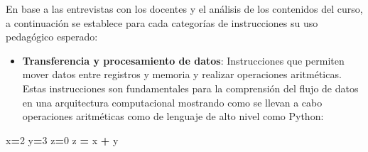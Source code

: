 \documentclass[12pt,oneside]{templates/unerthesis}
\newenvironment{Shaded}{\begin{snugshade}}{\end{snugshade}}
\newcommand{\DecValTok}[1]{\textcolor[rgb]{0.00,0.00,0.81}{#1}}
\newcommand{\NormalTok}[1]{#1}
\newcommand{\OperatorTok}[1]{\textcolor[rgb]{0.81,0.36,0.00}{\textbf{#1}}}
\providecommand{\tightlist}{%
  \setlength{\itemsep}{0pt}\setlength{\parskip}{0pt}}
\begin{document}
\begin{table}[!h]
\centering
\caption{\label{tab:setreducido}Tabla de instrucciones de VonSim8}
\centering
{}
\end{table}

En base a las entrevistas con los docentes y el análisis de los contenidos del curso, a continuación se establece para cada categorías de instrucciones su uso pedagógico esperado:

\begin{itemize}
\tightlist
\item
  \textbf{Transferencia y procesamiento de datos}: Instrucciones que permiten mover datos entre registros y memoria y realizar operaciones aritméticas. Estas instrucciones son fundamentales para la comprensión del flujo de datos en una arquitectura computacional mostrando como se llevan a cabo operaciones aritméticas como de lenguaje de alto nivel como Python:
\end{itemize}

\begin{Shaded}
\begin{Highlighting}[]
\NormalTok{x}\OperatorTok{=}\DecValTok{2}
\NormalTok{y}\OperatorTok{=}\DecValTok{3}
\NormalTok{z}\OperatorTok{=}\DecValTok{0}
\NormalTok{z }\OperatorTok{=}\NormalTok{ x }\OperatorTok{+}\NormalTok{ y}
\end{Highlighting}
\end{Shaded}
\end{document}

